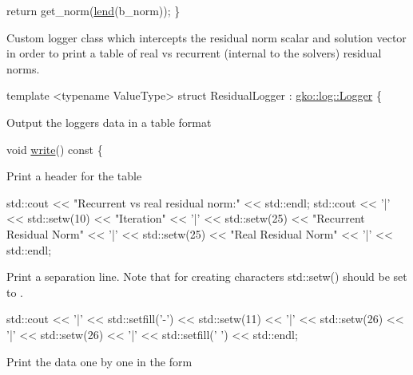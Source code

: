 \begin{DoxyCode}
    \textcolor{keywordflow}{return} get\_norm(\hyperlink{namespacegko_aa8cb4876b72e5e1036ea9575443c439b}{lend}(b\_norm));
\}
\end{DoxyCode}


Custom logger class which intercepts the residual norm scalar and solution vector in order to print a table of real vs recurrent (internal to the solvers) residual norms.


\begin{DoxyCode}
\textcolor{keyword}{template} <\textcolor{keyword}{typename} ValueType>
\textcolor{keyword}{struct }ResidualLogger : \hyperlink{classgko_1_1log_1_1Logger}{gko::log::Logger} \{
\end{DoxyCode}


Output the logger\textquotesingle{}s data in a table format


\begin{DoxyCode}
\textcolor{keywordtype}{void} \hyperlink{namespacegko_a859dc47a462721d83728d91ab7fa2148}{write}()\textcolor{keyword}{ const}
\textcolor{keyword}{}\{
\end{DoxyCode}


Print a header for the table


\begin{DoxyCode}
std::cout << \textcolor{stringliteral}{"Recurrent vs real residual norm:"} << std::endl;
std::cout << \textcolor{charliteral}{'|'} << std::setw(10) << \textcolor{stringliteral}{"Iteration"} << \textcolor{charliteral}{'|'} << std::setw(25)
          << \textcolor{stringliteral}{"Recurrent Residual Norm"} << \textcolor{charliteral}{'|'} << std::setw(25)
          << \textcolor{stringliteral}{"Real Residual Norm"} << \textcolor{charliteral}{'|'} << std::endl;
\end{DoxyCode}


Print a separation line. Note that for creating {} characters {\ttfamily std\+::setw()} should be set to {}.


\begin{DoxyCode}
std::cout << \textcolor{charliteral}{'|'} << std::setfill(\textcolor{charliteral}{'-'}) << std::setw(11) << \textcolor{charliteral}{'|'}
          << std::setw(26) << \textcolor{charliteral}{'|'} << std::setw(26) << \textcolor{charliteral}{'|'}
          << std::setfill(\textcolor{charliteral}{' '}) << std::endl;
\end{DoxyCode}


Print the data one by one in the form


